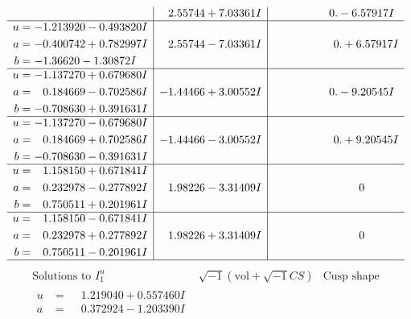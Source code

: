 \documentclass[1p]{elsarticle_modified}
\theoremstyle{definition}
\newcommand{\I}{\sqrt{-1}}
\begin{document}
$$\begin{array}{c|c|c}
 & \phantom{-}2.55744 + 7.03361 I & \phantom{-0.000000 } 0. - 6.57917 I \\ \hline\begin{aligned}
u &= -1.213920 - 0.493820 I \\
a &= -0.400742 + 0.782997 I \\
b &= -1.36620 - 1.30872 I\end{aligned}
 & \phantom{-}2.55744 - 7.03361 I & \phantom{-0.000000 -}0. + 6.57917 I \\ \hline\begin{aligned}
u &= -1.137270 + 0.679680 I \\
a &= \phantom{-}0.184669 - 0.702586 I \\
b &= -0.708630 + 0.391631 I\end{aligned}
 & -1.44466 + 3.00552 I & \phantom{-0.000000 } 0. - 9.20545 I \\ \hline\begin{aligned}
u &= -1.137270 - 0.679680 I \\
a &= \phantom{-}0.184669 + 0.702586 I \\
b &= -0.708630 - 0.391631 I\end{aligned}
 & -1.44466 - 3.00552 I & \phantom{-0.000000 -}0. + 9.20545 I \\ \hline\begin{aligned}
u &= \phantom{-}1.158150 + 0.671841 I \\
a &= \phantom{-}0.232978 - 0.277892 I \\
b &= \phantom{-}0.750511 + 0.201961 I\end{aligned}
 & \phantom{-}1.98226 - 3.31409 I & \phantom{-0.000000 } 0 \\ \hline\begin{aligned}
u &= \phantom{-}1.158150 - 0.671841 I \\
a &= \phantom{-}0.232978 + 0.277892 I \\
b &= \phantom{-}0.750511 - 0.201961 I\end{aligned}
 & \phantom{-}1.98226 + 3.31409 I & \phantom{-0.000000 } 0\\
 \hline 
 \end{array}$$\newpage$$\begin{array}{c|c|c}  
\text{Solutions to }I^u_{1}& \I (\text{vol} + \sqrt{-1}CS) & \text{Cusp shape}\\
 \hline 
\begin{aligned}
u &= \phantom{-}1.219040 + 0.557460 I \\
a &= \phantom{-}0.372924 - 1.203390 I \\

\end{aligned}
\end{array}$$
\end{document}
